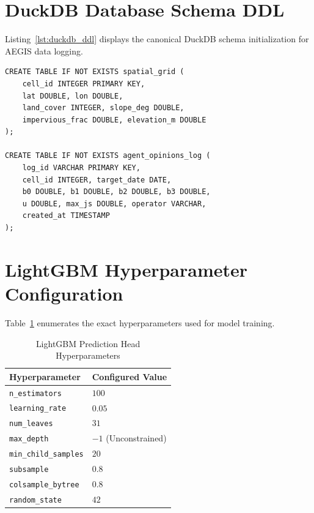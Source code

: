 \section{DuckDB Database Schema DDL}
\label{app:duckdb_ddl}
Listing~\ref{lst:duckdb_ddl} displays the canonical DuckDB schema initialization for AEGIS data logging.

\begin{verbatim}
CREATE TABLE IF NOT EXISTS spatial_grid (
    cell_id INTEGER PRIMARY KEY,
    lat DOUBLE, lon DOUBLE,
    land_cover INTEGER, slope_deg DOUBLE,
    impervious_frac DOUBLE, elevation_m DOUBLE
);

CREATE TABLE IF NOT EXISTS agent_opinions_log (
    log_id VARCHAR PRIMARY KEY,
    cell_id INTEGER, target_date DATE,
    b0 DOUBLE, b1 DOUBLE, b2 DOUBLE, b3 DOUBLE,
    u DOUBLE, max_js DOUBLE, operator VARCHAR,
    created_at TIMESTAMP
);
\end{verbatim}

\section{LightGBM Hyperparameter Configuration}
\label{app:hyperparameters}
Table~\ref{tab:lgbm_params} enumerates the exact hyperparameters used for model training.

\begin{table}[htbp]
\caption{LightGBM Prediction Head Hyperparameters}
\label{tab:lgbm_params}
\centering
\begin{tabular}{ll}
\toprule
\textbf{Hyperparameter} & \textbf{Configured Value} \\
\midrule
\texttt{n\_estimators} & $100$ \\
\texttt{learning\_rate} & $0.05$ \\
\texttt{num\_leaves} & $31$ \\
\texttt{max\_depth} & $-1$ (Unconstrained) \\
\texttt{min\_child\_samples} & $20$ \\
\texttt{subsample} & $0.8$ \\
\texttt{colsample\_bytree} & $0.8$ \\
\texttt{random\_state} & $42$ \\
\bottomrule
\end{tabular}
\end{table}

